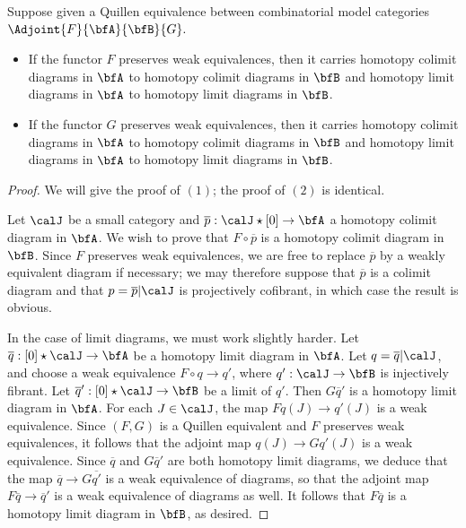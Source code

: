 \begin{lemma}\label{urqi}
Suppose given a Quillen equivalence between combinatorial model categories
$\Adjoint{F}{\bfA}{\bfB}{G}.$
\begin{itemize}
\item[$(1)$] If the functor $F$ preserves weak equivalences, then it carries homotopy
colimit diagrams in $\bfA$ to homotopy colimit diagrams in $\bfB$ and homotopy limit
diagrams in $\bfA$ to homotopy limit diagrams in $\bfB$.
\item[$(2)$] If the functor $G$ preserves weak equivalences, then it carries homotopy
colimit diagrams in $\bfA$ to homotopy colimit diagrams in $\bfB$ and homotopy limit
diagrams in $\bfA$ to homotopy limit diagrams in $\bfB$.
\end{itemize}
\end{lemma}

\begin{proof}
We will give the proof of $(1)$; the proof of $(2)$ is identical.

Let $\calJ$ be a small category and $\overline{p}: \calJ \star [0] \rightarrow \bfA$
a homotopy colimit diagram in $\bfA$. We wish to prove that $F \circ \overline{p}$ is a homotopy colimit
diagram in $\bfB$. Since $F$ preserves weak equivalences, we are free to replace $\overline{p}$ by a weakly equivalent diagram if necessary; we may therefore suppose that $\overline{p}$ is a colimit diagram and that $p = \overline{p}|\calJ$ is projectively cofibrant, in which case the result is obvious.

In the case of limit diagrams, we must work slightly harder. Let $\overline{q}: [0] \star \calJ \rightarrow \bfA$ be a homotopy limit diagram in $\bfA$. Let $q = \overline{q} | \calJ$, and choose a
weak equivalence $F \circ q \rightarrow q'$, where $q': \calJ \rightarrow \bfB$ is injectively fibrant.
Let $\overline{q}': [0] \star \calJ \rightarrow \bfB$ be a limit of $q'$. Then
$G \overline{q}'$ is a homotopy limit diagram in $\bfA$. For each $J \in \calJ$, the map
$F q(J) \rightarrow q'(J)$ is a weak equivalence. Since $(F,G)$ is a Quillen equivalent and $F$ preserves weak equivalences, it follows that the adjoint map $q(J) \rightarrow G q'(J)$ is a weak equivalence. Since $\overline{q}$ and $G \overline{q}'$ are both homotopy limit diagrams, we
deduce that the map $\overline{q} \rightarrow G \overline{q'}$ is a weak equivalence of diagrams, so that the adjoint map $F \overline{q} \rightarrow \overline{q}'$ is a weak equivalence of diagrams as well. It follows that $F \overline{q}$ is a homotopy limit diagram in $\bfB$, as desired.
\end{proof}

